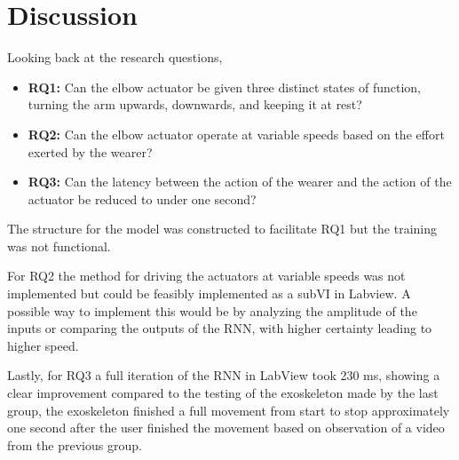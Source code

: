 \section{Discussion}
\label{section:disc}

Looking back at the research questions,

\begin{itemize}
        
    \item \textbf{RQ1:} Can the elbow actuator be given three distinct states of function, turning the arm upwards, downwards, and keeping it at rest?

    \item \textbf{RQ2:} Can the elbow actuator operate at variable speeds based on the effort exerted by the wearer?

    \item \textbf{RQ3:} Can the latency between the action of the wearer and the action of the actuator be reduced to under one second?

\end{itemize}

The structure for the model was constructed to facilitate RQ1 but the training was not functional.

For RQ2 the method for driving the actuators at variable speeds was not implemented but could be feasibly implemented as a subVI in Labview. 
A possible way to implement this would be by analyzing the amplitude of the inputs or comparing the outputs of the RNN, with higher certainty leading to higher speed.

Lastly, for RQ3 a full iteration of the RNN in LabView took 230 ms, showing a clear improvement compared to the testing of the exoskeleton 
made by the last group, the exoskeleton finished a full movement from start to stop approximately one second after the user finished the 
movement based on observation of a video from the previous group.
